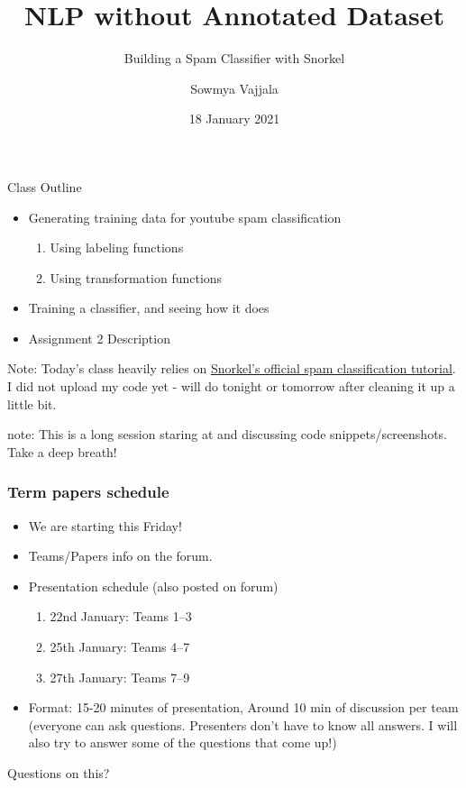 \documentclass{beamer}
\author[Sowmya Vajjala]{Sowmya Vajjala}
\title[SfSNLP]{NLP without Annotated Dataset}
\subtitle{Building a Spam Classifier with Snorkel}
\date{18 January 2021}
\institute{Seminar f\"ur Sprachwissenschaft, University of T\"ubingen, Germany}
\begin{document}
\begin{frame}\titlepage
\end{frame}

\begin{frame}{Class Outline}
    \begin{itemize}
        \item Generating training data for youtube spam classification
        \begin{enumerate}
            \item Using labeling functions
            \item Using transformation functions
        \end{enumerate}
        \item Training a classifier, and seeing how it does
        \item Assignment 2 Description
    \end{itemize}
    \small Note: Today's class heavily relies on \href{https://github.com/snorkel-team/snorkel-tutorials/tree/master/spam}{Snorkel's official spam classification tutorial}. I did not upload my code yet - will do tonight or tomorrow after cleaning it up a little bit. 
    
    \small note: This is a long session staring at and discussing code snippets/screenshots. Take a deep breath!
\end{frame}

\begin{frame}
\frametitle{Term papers schedule}
\begin{itemize}
\item We are starting this Friday!
    \item Teams/Papers info on the forum.
    \item Presentation schedule  (also posted on forum)
    \begin{enumerate}
        \item 22nd January: Teams 1--3
        \item 25th January: Teams 4--7
        \item 27th January: Teams 7--9
    \end{enumerate}
    \item Format: 15-20 minutes of presentation, Around 10 min of discussion per team (everyone can ask questions. Presenters don't have to know all answers. I will also try to answer some of the questions that come up!)
\end{itemize}
Questions on this? 
\end{frame}
\end{document}
